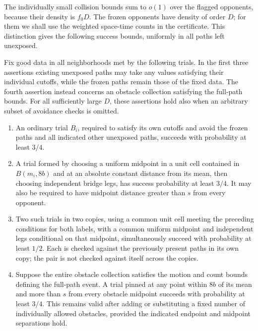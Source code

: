 The individually small collision bounds sum to $o(1)$ over the
flagged opponents, because their density is $f_0D$.  The frozen
opponents have density of order $D$; for them we shall use the
weighted space-time counts in the certificate.  This distinction gives
the following success bounds, uniformly in all paths left unexposed.

\begin{proposition}\label{lp:insertion}
Fix good data in all neighborhoods met by the following trials.  In the
first three assertions existing unexposed paths may take any values
satisfying their individual cutoffs, while the frozen paths remain those
of the fixed data.  The fourth assertion instead concerns an obstacle
collection satisfying the full-path bounds.  For all sufficiently large
$D$, these assertions hold also when an arbitrary subset of avoidance
checks is omitted.
\begin{enumerate}
\item An ordinary trial $B_i$, required to satisfy its own cutoffs and
avoid the frozen paths and all indicated other unexposed paths, succeeds
with probability at least $3/4$.
\item A trial formed by choosing a uniform midpoint in a unit cell
contained in $B(m_i,8b)$ and at an absolute constant distance from
its mean, then choosing independent bridge legs, has success probability
at least $3/4$.  It may also be
required to have midpoint distance greater than $s$ from every opponent.
\item Two such trials in two copies, using a common unit cell meeting
the preceding conditions for both labels, with a common uniform midpoint
and independent legs conditional on that midpoint, simultaneously succeed
with probability at least $1/2$.  Each is checked against the previously
present paths in its own copy; the pair is not checked against itself
across the copies.
\item Suppose the entire obstacle collection satisfies the motion and
count bounds defining the full-path event.  A trial pinned at any point
within $8b$ of its mean and more than $s$ from every obstacle midpoint
succeeds with probability at least $3/4$.  This remains valid after adding
or substituting a fixed number of individually allowed obstacles, provided
the indicated endpoint and midpoint separations hold.
\end{enumerate}
\end{proposition}

